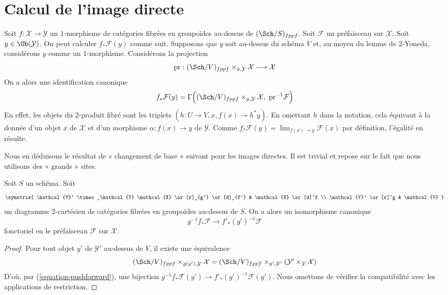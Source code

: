\section{Calcul de l'image directe}
\label{section-pushforward}

\noindent
Soit $f : \mathcal{X} \to \mathcal{Y}$ un $1$-morphisme de catégories
fibrées en groupoïdes au-dessus de $(\Sch/S)_{fppf}$. Soit $\mathcal{F}$
un préfaisceau sur $\mathcal{X}$. Soit $y \in \Ob(\mathcal{Y})$.
On peut calculer $f_*\mathcal{F}(y)$ comme suit. Supposons que
$y$ soit au-dessus du schéma $V$ et, au moyen du lemme de $2$-Yoneda, considérons
$y$ comme un $1$-morphisme. Considérons la projection
$$
\text{pr} :
(\Sch/V)_{fppf} \times_{y, \mathcal{Y}} \mathcal{X}
\longrightarrow
\mathcal{X}
$$
On a alors une identification canonique
\begin{equation}
\label{equation-pushforward}
f_*\mathcal{F}(y) = \Gamma\Big(
(\Sch/V)_{fppf} \times_{y, \mathcal{Y}} \mathcal{X},
\ \text{pr}^{-1}\mathcal{F}\Big)
\end{equation}
En effet, les objets du $2$-produit fibré sont les triplets
$(h : U \to V, x, f(x) \to h^*y)$. En omettant $h$ dans la
notation, cela équivaut à la donnée d'un objet
$x$ de $\mathcal{X}$ et d'un morphisme $\alpha : f(x) \to y$ de $\mathcal{Y}$.
Comme $f_*\mathcal{F}(y) = \lim_{f(x) \to y} \mathcal{F}(x)$ par définition,
l'égalité en résulte.

\medskip\noindent
Nous en déduisons le résultat de « changement de base » suivant pour les
images directes. Il est trivial et repose sur le fait que
nous utilisons des « grands » sites.

\begin{lemma}
\label{lemma-base-change}
Soit $S$ un schéma. Soit
$$
\xymatrix{
\mathcal{Y}' \times_\mathcal{Y} \mathcal{X} \ar[r]_{g'} \ar[d]_{f'} &
\mathcal{X} \ar[d]^f \\
\mathcal{Y}' \ar[r]^g & \mathcal{Y}
}
$$
un diagramme $2$-cartésien de catégories fibrées en groupoïdes au-dessus de $S$.
On a alors un isomorphisme canonique
$$
g^{-1}f_*\mathcal{F} \longrightarrow f'_*(g')^{-1}\mathcal{F}
$$
fonctoriel en le préfaisceau $\mathcal{F}$ sur $\mathcal{X}$.
\end{lemma}

\begin{proof}
Pour tout objet $y'$ de $\mathcal{Y}'$ au-dessus de $V$,
il existe une équivalence
$$
(\Sch/V)_{fppf} \times_{g(y'), \mathcal{Y}} \mathcal{X}
=
(\Sch/V)_{fppf} \times_{y', \mathcal{Y}'}
(\mathcal{Y}' \times_\mathcal{Y} \mathcal{X})
$$
D'où, par (\ref{equation-pushforward}), une bijection
$g^{-1}f_*\mathcal{F}(y') \to f'_*(g')^{-1}\mathcal{F}(y')$.
Nous omettons de vérifier la compatibilité avec les applications
de restriction.
\end{proof}


